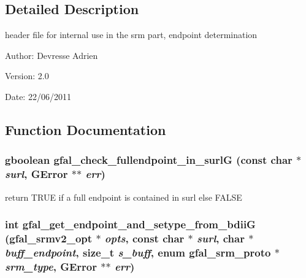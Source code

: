 \subsection{Detailed Description}
header file for internal use in the srm part, endpoint determination 

\begin{Desc}
\item[Author:]Devresse Adrien \end{Desc}
\begin{Desc}
\item[Version:]2.0 \end{Desc}
\begin{Desc}
\item[Date:]22/06/2011 \end{Desc}


\subsection{Function Documentation}
\subsubsection{\setlength{\rightskip}{0pt plus 5cm}gboolean gfal\_\-check\_\-fullendpoint\_\-in\_\-surl\-G (const char $\ast$ {\em surl}, GError $\ast$$\ast$ {\em err})}\label{gfal__common__srm__endpoint_8h_99a6995d5d222d54f28d7952499f60ba}


return TRUE if a full endpoint is contained in surl else FALSE 
\subsubsection{\setlength{\rightskip}{0pt plus 5cm}int gfal\_\-get\_\-endpoint\_\-and\_\-setype\_\-from\_\-bdii\-G (gfal\_\-srmv2\_\-opt $\ast$ {\em opts}, const char $\ast$ {\em surl}, char $\ast$ {\em buff\_\-endpoint}, size\_\-t {\em s\_\-buff}, enum gfal\_\-srm\_\-proto $\ast$ {\em srm\_\-type}, GError $\ast$$\ast$ {\em err})}\label{gfal__common__srm__endpoint_8h_8ce7110e994216e73c28b439829b1d21}


